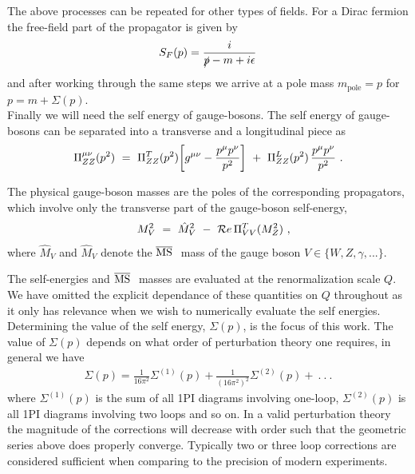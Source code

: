 \documentclass[11pt]{article}
\begin{document}
The above processes can be repeated for other types of fields.  For a Dirac fermion the free-field part of the propagator is given by
\begin{align}
S_F(p) = \frac{i}{\slashed{p}-m+i\epsilon}
\end{align}
and after working through the same steps we arrive at a pole mass $m_{\text{pole}}=p$ for $p=m+\Sigma(p)$.\\

Finally we will need the self energy of gauge-bosons.  The self energy of gauge-bosons can be separated into a transverse and a longitudinal piece as
\begin{equation}
\Pi^{\mu\nu}_{ZZ}(p^2) \ =\ \Pi_{ZZ}^T(p^2)\biggl[g^{\mu\nu}
-{p^{\mu}p^{\nu}\over p^2}\biggr] \ +\ \Pi_{ZZ}^L(p^2)\,
{p^{\mu}p^{\nu}\over p^2}\ .
\end{equation}

The physical gauge-boson masses are the poles of the corresponding
propagators, which involve only the transverse part of the gauge-boson
self-energy,
%
\begin{eqnarray}
&& M_V^2 \ =\ \hat M_V^2 \ -\ {\cal
R}e\,\Pi^T_{VV}(M_Z^2)~,\label{mz}
\end{eqnarray}
%
where $\hat M_V$ and $\hat M_V$ denote the
\mbox{\footnotesize$\overline{\rm MS}~$} mass of the gauge boson $V\in\{W,Z,\gamma, ... \}$.


The self-energies and \mbox{\footnotesize$\overline{\rm MS}~$} masses are evaluated at the renormalization scale $Q$.  We have omitted the explicit dependance of these quantities on $Q$ throughout as it only has relevance when we wish to numerically evaluate the self energies.\\

Determining the value of the self energy, $\Sigma(p)$, is the focus of this work.  The value of $\Sigma(p)$ depends on what order of perturbation theory one requires, in general we have
\begin{align}
\Sigma(p) = \frac{1}{16\pi^2}\Sigma^{(1)}(p)+\frac{1}{\left(16\pi^2\right)^2}\Sigma^{(2)}(p)+\ . \ . \ .
\end{align}
where $\Sigma^{(1)}(p)$ is the sum of all 1PI diagrams involving one-loop, $\Sigma^{(2)}(p)$ is all 1PI diagrams involving two loops and so on.  In a valid perturbation theory the magnitude of the corrections will decrease with order such that the geometric series above does properly converge.  Typically two or three loop corrections are considered sufficient when comparing to the precision of modern experiments.\\
\end{document}
